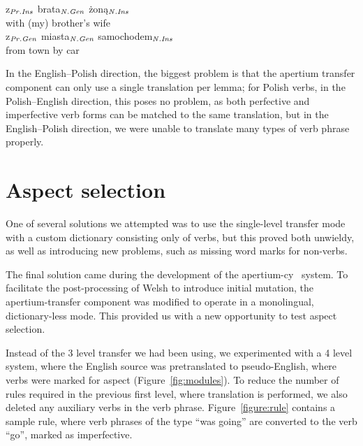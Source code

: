 \documentclass[11pt]{article}
\begin{document}
\begin{center}
\begin{table}[htdp]
z$_{\it Pr.Ins}$ brata$_{\it N.Gen}$ {\.{z}on\k{a}}$_{\it N.Ins}$ \\
with (my) brother's wife \\
z$_{\it Pr.Gen}$ miasta$_{\it N.Gen}$ samochodem$_{\it N.Ins}$\\
from town by car
\end{table}
\end{center}

In the English--Polish direction, the biggest problem is that the
apertium transfer component can only use a single translation per lemma;
for Polish verbs, in the Polish--English direction, this poses no problem,
as both perfective and imperfective verb forms can be matched to the
same translation, but in the English--Polish direction, we were unable to
translate many types of verb phrase properly.

\section{Aspect selection}

One of several solutions we attempted was to use the single-level transfer
mode with a custom dictionary consisting only of verbs, but this proved both
unwieldy, as well as introducing new problems, such as missing word marks for
non-verbs.

The final solution came during the development of the apertium-cy~\cite{tyers2009acd}
system. To facilitate the post-processing of Welsh to introduce initial mutation, the
apertium-transfer component was modified to operate in a monolingual, dictionary-less
mode. This provided us with a new opportunity to test aspect selection.

Instead of the 3 level transfer we had been using, we experimented with a 4 level
system, where the English source was pretranslated to pseudo-English, where verbs
were marked for aspect (Figure~\ref{fig:modules}). To reduce the number of 
rules required in the previous first level, where translation is performed, 
we also deleted any auxiliary verbs in
the verb phrase. Figure~\ref{figure:rule} contains a sample rule, where verb 
phrases of the type ``was going'' are converted to the verb ``go'', marked as
imperfective.
\end{document}
